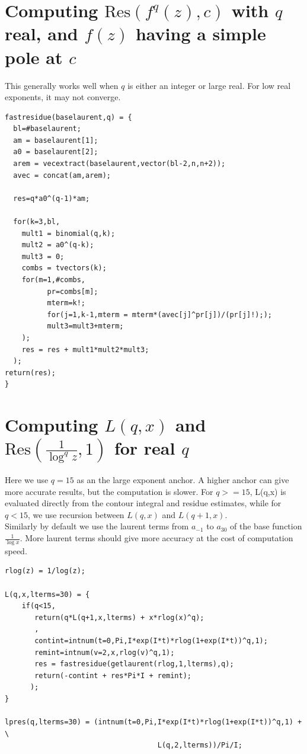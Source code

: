 \documentclass[a4paper,11pt,twoside]{amsart}
\newcommand\Res{\mathrm{Res}}
\begin{document}
\section{Computing $\Res(f^{q}(z),c)$ with $q$ real, and $f(z)$ having a simple pole at $c$}

This generally works well when $q$ is either an integer or large real. For low real exponents, it may not converge.
  
\begin{verbatim}
fastresidue(baselaurent,q) = {
  bl=#baselaurent;
  am = baselaurent[1];
  a0 = baselaurent[2];
  arem = vecextract(baselaurent,vector(bl-2,n,n+2));
  avec = concat(am,arem);

  res=q*a0^(q-1)*am;

  for(k=3,bl,
    mult1 = binomial(q,k);
    mult2 = a0^(q-k);
    mult3 = 0;
    combs = tvectors(k);
    for(m=1,#combs,
          pr=combs[m];
          mterm=k!;
          for(j=1,k-1,mterm = mterm*(avec[j]^pr[j])/(pr[j]!););
          mult3=mult3+mterm;
    );
    res = res + mult1*mult2*mult3;
  );
return(res);
}
\end{verbatim}

\section{Computing $L(q,x)$ and $\Res\left(\frac{1}{\log^{q} z}, 1\right)$ for real $q$}
Here we use $q=15$ as an the large exponent anchor. A higher anchor can give more accurate results, but the computation is slower. For $q>=15$, L(q,x) is evaluated directly from the contour integral and residue estimates, while for $q<15$, we use recursion between $L(q,x)$ and $L(q+1,x)$.\\
Similarly by default we use the laurent terms from $a_{-1}$ to $a_{30}$ of the base function $\frac{1}{\log x}$. More laurent terms should give more accuracy at the cost of computation speed.

\begin{verbatim}
rlog(z) = 1/log(z);

L(q,x,lterms=30) = {
    if(q<15,
       return(q*L(q+1,x,lterms) + x*rlog(x)^q);
       ,
       contint=intnum(t=0,Pi,I*exp(I*t)*rlog(1+exp(I*t))^q,1);
       remint=intnum(v=2,x,rlog(v)^q,1);
       res = fastresidue(getlaurent(rlog,1,lterms),q);
       return(-contint + res*Pi*I + remint);
      );
}

lpres(q,lterms=30) = (intnum(t=0,Pi,I*exp(I*t)*rlog(1+exp(I*t))^q,1) + \
                                    L(q,2,lterms))/Pi/I;
\end{verbatim}
\end{document}
